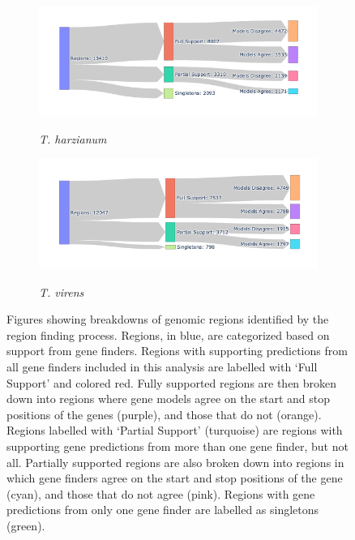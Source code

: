 \begin{figure}
  \ContinuedFloat
  \centering
  \begin{subfigure}{0.9\textwidth}
    \includegraphics[width=\textwidth]{figures/t-harzianum-region-breakdown.png}
    \label{fig:t-harzianum-regions}
    \caption{\textit{T. harzianum}}
  \end{subfigure}
  \begin{subfigure}{0.9\textwidth}
    \includegraphics[width=\textwidth]{figures/t-virens-region-breakdown.png}
    \label{fig:t-virens-regions}
    \caption{\textit{T. virens}}
  \end{subfigure}
  \caption[Breakdown of identified regions]{Figures showing breakdowns
    of genomic regions identified by the region finding
    process. Regions, in blue, are categorized based on support from
    gene finders. Regions with supporting predictions from all gene
    finders included in this analysis are labelled with `Full Support'
    and colored red. Fully supported regions are then broken down into
    regions where gene models agree on the start and stop positions of
    the genes (purple), and those that do not (orange). Regions
    labelled with `Partial Support' (turquoise) are regions with
    supporting gene predictions from more than one gene finder, but
    not all. Partially supported regions are also broken down into
    regions in which gene finders agree on the start and stop
    positions of the gene (cyan), and those that do not agree
    (pink). Regions with gene predictions from only one gene finder
    are labelled as singletons (green).}
  \label{fig:regions-sankey}
\end{figure}

